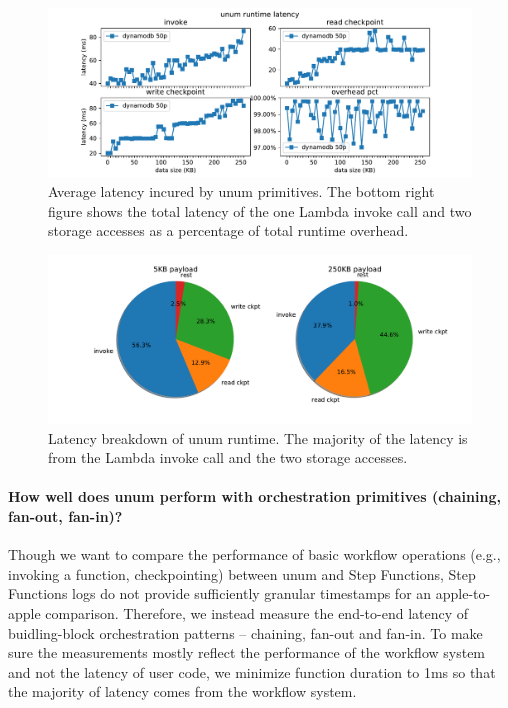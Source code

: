 \begin{figure}[t!]
    \centering
    \includegraphics[width=\columnwidth]{figures/OpLatency.pdf}
    \caption{Average latency incured by unum primitives. The bottom right figure shows the total latency of the one Lambda invoke call and two storage accesses as a percentage of total runtime overhead.}
    \label{fig:oplatency}
\end{figure}

\begin{figure}[t!]
    \centering
    \includegraphics[width=\columnwidth]{figures/OpLatency-pct.pdf}
    \caption{Latency breakdown of unum runtime. The majority of the latency is
    from the Lambda invoke call and the two storage accesses.}
    \label{fig:oplatency-pct}
\end{figure}




\paragraph{How well does unum perform with orchestration primitives (chaining,
fan-out, fan-in)?}


Though we want to compare the performance of basic workflow operations (e.g.,
invoking a function, checkpointing) between unum and Step Functions, Step
Functions logs do not provide sufficiently granular timestamps for an
apple-to-apple comparison. Therefore, we instead measure the end-to-end
latency of buidling-block orchestration patterns -- chaining, fan-out and
fan-in. To make sure the measurements mostly reflect the performance of the
workflow system and not the latency of user code, we minimize function
duration to 1ms so that the majority of latency comes from the workflow
system.


